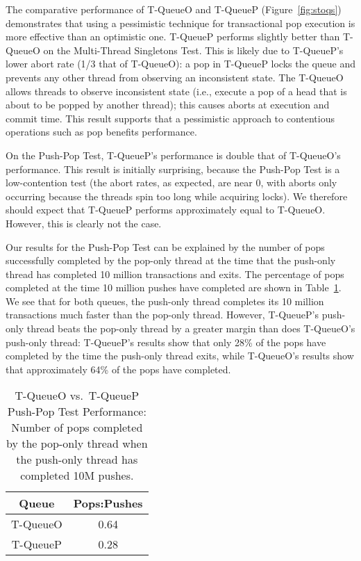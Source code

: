 The comparative performance of T-QueueO and T-QueueP (Figure~\ref{fig:stoqs}) demonstrates that using a pessimistic technique for transactional pop execution is more effective than an optimistic one. 
T-QueueP performs slightly better than T-QueueO on the Multi-Thread Singletons Test. This is likely due to T-QueueP's lower abort rate (1/3 that of T-QueueO): a pop in T-QueueP locks the queue and prevents any other thread from observing an inconsistent state. The T-QueueO allows threads to observe inconsistent state (i.e., execute a pop of a head that is about to be popped by another thread); this causes aborts at execution and commit time.
This result supports that a pessimistic approach to contentious operations such as pop benefits performance.

On the Push-Pop Test, T-QueueP's performance is double that of T-QueueO's performance. This result is initially surprising, because the Push-Pop Test is a low-contention test (the abort rates, as expected, are near 0, with aborts only occurring because the threads spin too long while acquiring locks). We therefore should expect that T-QueueP performs approximately equal to T-QueueO. However, this is clearly not the case.

Our results for the Push-Pop Test can be explained by the number of pops successfully completed by the pop-only thread at the time that the push-only thread has completed 10 million transactions and exits. The percentage of pops completed at the time 10 million pushes have completed are shown in Table~\ref{tab:sto_pop_push_ratio}.
We see that for both queues, the push-only thread completes its 10 million transactions much faster than the pop-only thread. However, T-QueueP's push-only thread beats the pop-only thread by a greater margin than does T-QueueO's push-only thread: T-QueueP's results show that only 28\% of the pops have completed by the time the push-only thread exits, while T-QueueO's results show that approximately 64\% of the pops have completed.

\begin{table}[t]
        \centering
    \begin{tabular}{|cc|}
        \hline
        Queue & Pops:Pushes\\
        \hline
            T-QueueO & 0.64\\
            T-QueueP & 0.28\\
        \hline
    \end{tabular}
    \caption{T-QueueO vs.\ T-QueueP Push-Pop Test Performance: Number of pops completed by the pop-only thread when the push-only thread has completed 10M pushes.}
    \label{tab:sto_pop_push_ratio}
\end{table}

